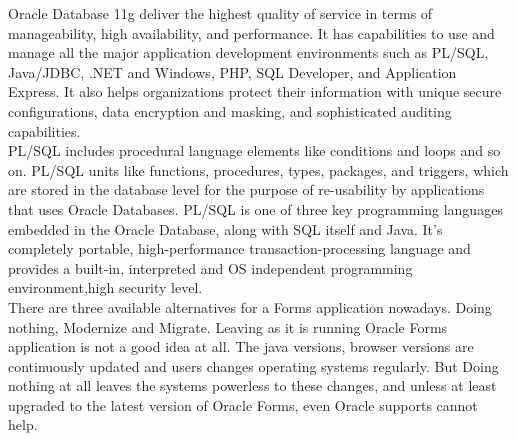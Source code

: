 \documentclass[12pt]{report} %
\begin{document}
Oracle Database 11g deliver the highest quality of service in terms of manageability, high availability, and performance. It has capabilities to use and manage all the major application development environments such as PL/SQL, Java/JDBC, .NET and Windows, PHP, SQL Developer, and Application Express. It also helps organizations protect their information with unique secure configurations, data encryption and masking, and sophisticated auditing capabilities. \cite{sql_book, sql_book2} \label{sec:sql_book_1}\\


PL/SQL includes procedural language elements like conditions and loops and so on. PL/SQL units like  functions, procedures,  types, packages, and triggers, which are stored in the database level for the purpose of re-usability by applications that uses Oracle Databases. PL/SQL is one of three key programming languages embedded in the Oracle Database, along with SQL itself and Java. It's completely portable, high-performance transaction-processing language and provides a built-in, interpreted and OS independent programming environment,high security level.\cite{plsql_book, plsql_book2}  \label{sec:plsql_book_1}\\



There are three available alternatives for a Forms application nowadays. Doing nothing, Modernize and Migrate. Leaving as it is running Oracle Forms application is not a good idea at all. The java versions, browser versions are continuously updated and users changes operating systems regularly. But Doing nothing at all leaves the systems powerless to these changes, and unless at least upgraded to the latest version of Oracle Forms, even Oracle supports cannot help. \cite{feature_forms}  \label{sec:feature_forms_1}\\














\end{document}
